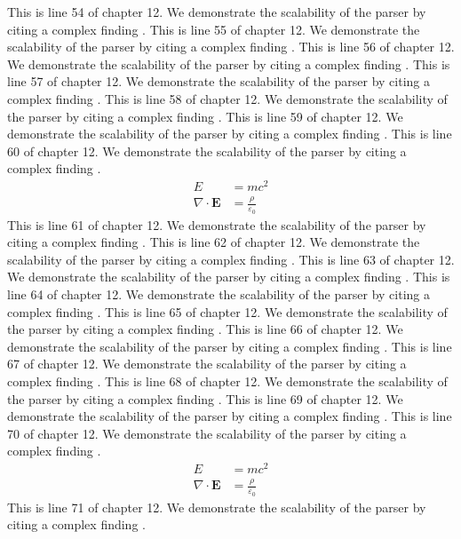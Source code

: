 This is line 54 of chapter 12. We demonstrate the scalability of the parser by citing a complex finding \cite{ref12_54}.
This is line 55 of chapter 12. We demonstrate the scalability of the parser by citing a complex finding \cite{ref12_55}.
This is line 56 of chapter 12. We demonstrate the scalability of the parser by citing a complex finding \cite{ref12_56}.
This is line 57 of chapter 12. We demonstrate the scalability of the parser by citing a complex finding \cite{ref12_57}.
This is line 58 of chapter 12. We demonstrate the scalability of the parser by citing a complex finding \cite{ref12_58}.
This is line 59 of chapter 12. We demonstrate the scalability of the parser by citing a complex finding \cite{ref12_59}.
This is line 60 of chapter 12. We demonstrate the scalability of the parser by citing a complex finding \cite{ref12_60}.
\begin{align*}
  E &= mc^2 \\
  \nabla \cdot \mathbf{E} &= \frac{\rho}{\varepsilon_0}
\end{align*}
This is line 61 of chapter 12. We demonstrate the scalability of the parser by citing a complex finding \cite{ref12_61}.
This is line 62 of chapter 12. We demonstrate the scalability of the parser by citing a complex finding \cite{ref12_62}.
This is line 63 of chapter 12. We demonstrate the scalability of the parser by citing a complex finding \cite{ref12_63}.
This is line 64 of chapter 12. We demonstrate the scalability of the parser by citing a complex finding \cite{ref12_64}.
This is line 65 of chapter 12. We demonstrate the scalability of the parser by citing a complex finding \cite{ref12_65}.
This is line 66 of chapter 12. We demonstrate the scalability of the parser by citing a complex finding \cite{ref12_66}.
This is line 67 of chapter 12. We demonstrate the scalability of the parser by citing a complex finding \cite{ref12_67}.
This is line 68 of chapter 12. We demonstrate the scalability of the parser by citing a complex finding \cite{ref12_68}.
This is line 69 of chapter 12. We demonstrate the scalability of the parser by citing a complex finding \cite{ref12_69}.
This is line 70 of chapter 12. We demonstrate the scalability of the parser by citing a complex finding \cite{ref12_70}.
\begin{align*}
  E &= mc^2 \\
  \nabla \cdot \mathbf{E} &= \frac{\rho}{\varepsilon_0}
\end{align*}
This is line 71 of chapter 12. We demonstrate the scalability of the parser by citing a complex finding \cite{ref12_71}.
